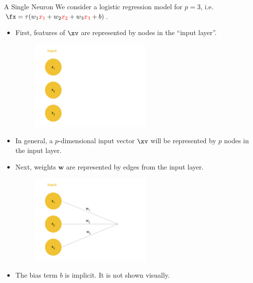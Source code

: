\begin{vbframe} {A Single Neuron}
We consider a logistic regression model for $p = 3$, i.e. $\fx = \tau(w_1\textcolor{red}{x_1} + w_2\textcolor{red}{x_2} + w_3\textcolor{red}{x_3} + b)$.
\begin{itemize}
\item First, features of $\xv$ are represented by nodes in the \enquote{input layer}.
\begin{figure}
\includegraphics[width=6cm]{figure/neurep_one.png}
\end{figure}
\item In general, a $p$-dimensional input vector $\xv$ will be represented by $p$ nodes in the input layer.
\framebreak

\item Next, weights $\mathbf{w}$ are represented by edges from the input layer.
\begin{figure}
\includegraphics[width=6cm]{figure/neurep_two.png}
\end{figure}
\item The bias term $b$ is implicit. It is not shown visually.
\end{itemize}
\framebreak


\end{vbframe}
